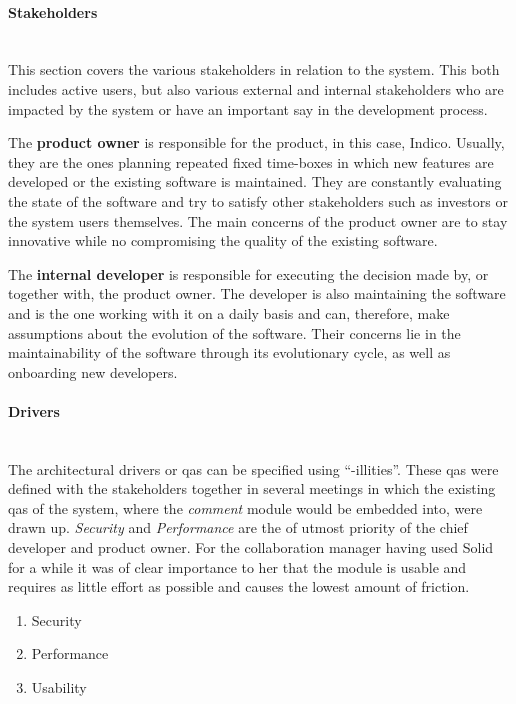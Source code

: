\paragraph{Stakeholders}\label{poc1-stakeholders}\mbox{}\\

This section covers the various stakeholders in relation to the system. This both includes active users, but also various external and internal stakeholders who are impacted by the system or have an important say in the development process.

The \textbf{product owner} is responsible for the product, in this case, Indico. Usually, they are the ones planning repeated fixed time-boxes in which new features are developed or the existing software is maintained. They are constantly evaluating the state of the software and try to satisfy other stakeholders such as investors or the system users themselves. The main concerns of the product owner are to stay innovative while no compromising the quality of the existing software.

The \textbf{internal developer} is responsible for executing the decision made by, or together with, the product owner. The developer is also maintaining the software and is the one working with it on a daily basis and can, therefore, make assumptions about the evolution of the software. Their concerns lie in the maintainability of the software through its evolutionary cycle, as well as onboarding new developers.
\vspace{0.5cm}
\paragraph{Drivers}\mbox{}\\

The architectural drivers or \glspl{qa} can be specified using “-illities”. These \glspl{qa} were defined with the stakeholders together in several meetings in which the existing \glspl{qa} of the system, where the \textit{comment} module would be embedded into, were drawn up. \textit{Security} and \textit{Performance} are the of utmost priority of the chief developer and product owner. For the collaboration manager having used Solid for a while it was of clear importance to her that the module is usable and requires as little effort as possible and causes the lowest amount of friction.

\begin{enumerate}
    \item Security
    \item Performance
    \item Usability
\end{enumerate}


